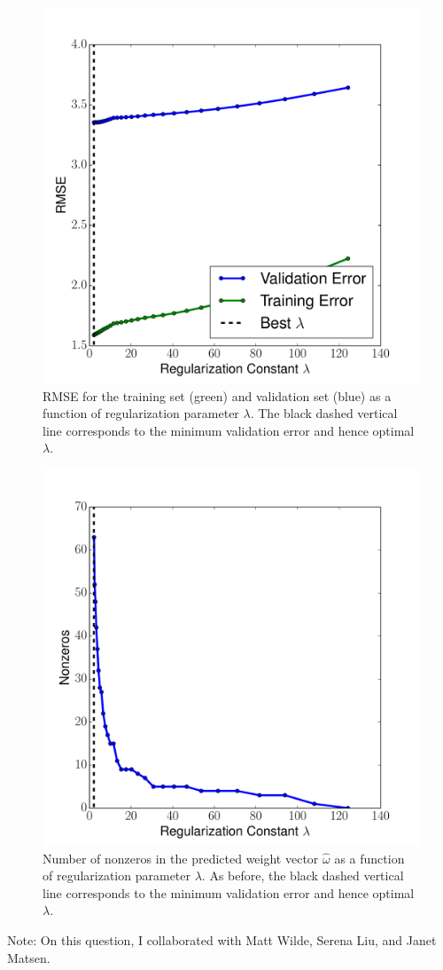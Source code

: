 \documentclass[12pt]{amsart}
\begin{document}
\begin{figure}
	\includegraphics[width=\columnwidth]{upvote_rmse.pdf}
    \caption{RMSE for the training set (green) and validation set (blue) as a function of regularization parameter $\lambda$.  The black dashed vertical line corresponds to the minimum validation error and hence optimal $\lambda$.}
    \label{fig:yelp_upvote_rmse}
\end{figure}

\begin{figure}
	\includegraphics[width=\columnwidth]{upvote_nonzeros.pdf}
    \caption{Number of nonzeros in the predicted weight vector $\hat{\omega}$ as a function of regularization parameter $\lambda$.  As before, the black dashed vertical line corresponds to the minimum validation error and hence optimal $\lambda$.}
    \label{fig:yelp_upvote_nonzeros}
\end{figure}

Note: On this question, I collaborated with Matt Wilde, Serena Liu, and Janet Matsen.
\end{document}
